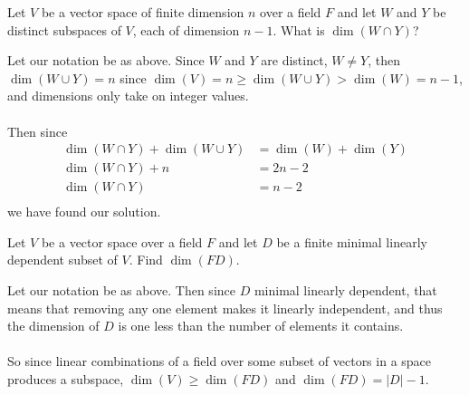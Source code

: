 \documentclass{article}
\begin{document}
\setcounter{problem}{213}
\begin{problem}
Let $V$ be a vector space of finite dimension $n$ over a field $F$ and let $W$ and $Y$ be distinct subspaces of $V$, each of dimension $n-1$. What is $\dim(W\cap Y)$?
\end{problem}

\begin{solution}
Let our notation be as above. Since $W$ and $Y$ are distinct, $W\ne Y$, then $\dim(W\cup Y) = n$ since $\dim(V)=n\ge\dim(W\cup Y)>\dim(W)=n-1$, and dimensions only take on integer values.

\paragraph{}
Then since 
\begin{align*}
\dim(W\cap Y) + \dim(W\cup Y) &= \dim(W) + \dim(Y)\\
\dim(W\cap Y) + n &= 2n-2\\
\dim(W\cap Y) &= n-2\\
\end{align*}
we have found our solution.
\end{solution}

\setcounter{problem}{231}
\begin{problem}
Let $V$ be a vector space over a field $F$ and let $D$ be a finite minimal linearly dependent subset of $V$. Find $\dim(FD)$.
\end{problem}

\begin{solution}
Let our notation be as above. Then since $D$ minimal linearly dependent, that means that removing any one element makes it linearly independent, and thus the dimension of $D$ is one less than the number of elements it contains.

\paragraph{}
So since linear combinations of a field over some subset of vectors in a space produces a subspace,
$\dim(V)\ge\dim(FD)$ and $\dim(FD) = |D| -1$.
\end{solution}
\end{document}
